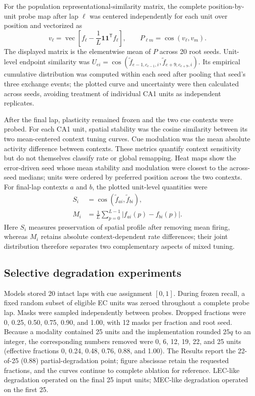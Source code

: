 For the population representational-similarity matrix, the complete
position-by-unit probe map after lap $\ell$ was centered independently for each
unit over position and vectorized as
\begin{equation}
v_\ell=\operatorname{vec}\!\left[
f_\ell-\frac{1}{L}\mathbf{1}\mathbf{1}^{\mathsf T}f_\ell
\right],\qquad
P_{\ell m}=\operatorname{cos}(v_\ell,v_m).
\label{eq:population-map-similarity}
\end{equation}
The displayed matrix is the elementwise mean of $P$ across 20 root seeds.
Unit-level endpoint similarity was
$U_{ei}=\operatorname{cos}(\widetilde f_{e-1,c_{e-1},i},
\widetilde f_{e+9,c_{e+9},i})$. Its empirical cumulative distribution was
computed within each seed after pooling that seed's three exchange events;
the plotted curve and uncertainty were then calculated across seeds, avoiding
treatment of individual CA1 units as independent replicates.

After the final lap, plasticity remained frozen and the two cue contexts were
probed. For each CA1 unit, spatial stability was the cosine similarity between
its two mean-centered context tuning curves. Cue modulation was the mean
absolute activity difference between contexts. These metrics quantify context
sensitivity but do not themselves classify rate or global remapping. Heat maps
show the error-driven seed whose mean stability and modulation were closest to the
across-seed medians; units were ordered by preferred position across the two
contexts.
For final-lap contexts $a$ and $b$, the plotted unit-level quantities were
\begin{align}
S_i &= \operatorname{cos}(\widetilde f_{a i},\widetilde f_{b i}),\\
M_i &= \frac{1}{L}\sum_{p=0}^{L-1}|f_{a i}(p)-f_{b i}(p)|.
\end{align}
Here $S_i$ measures preservation of spatial profile after removing mean firing,
whereas $M_i$ retains absolute context-dependent rate differences; their joint
distribution therefore separates two complementary aspects of mixed tuning.

\subsection{Selective degradation experiments}

Models stored 20 intact laps with cue assignment $[0,1]$. During frozen recall,
a fixed random subset of eligible EC units was zeroed throughout a complete
probe lap. Masks were sampled independently between probes. Dropped fractions
were 0, 0.25, 0.50, 0.75, 0.90, and 1.00, with 12 masks per fraction and root
seed. Because a modality contained 25 units and the implementation rounded
$25q$ to an integer, the corresponding numbers removed were 0, 6, 12, 19, 22,
and 25 units (effective fractions 0, 0.24, 0.48, 0.76, 0.88, and 1.00). The
Results report the 22-of-25 (0.88) partial-degradation point; figure abscissae
retain the requested fractions, and the curves continue to complete ablation
for reference.
LEC-like degradation operated on the final 25 input units; MEC-like degradation
operated on the first 25.

